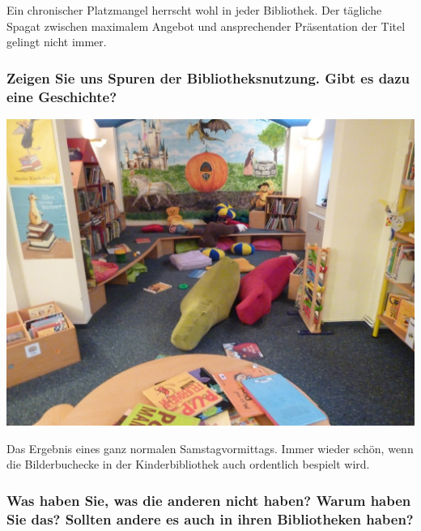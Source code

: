 Ein chronischer Platzmangel herrscht wohl in jeder Bibliothek. Der
tägliche Spagat zwischen maximalem Angebot und ansprechender
Präsentation der Titel gelingt nicht immer.

\hypertarget{zeigen-sie-uns-spuren-der-bibliotheksnutzung.-gibt-es-dazu-eine-geschichte}{%
\subsubsection*{Zeigen Sie uns Spuren der Bibliotheksnutzung. Gibt es dazu eine
Geschichte?}\label{zeigen-sie-uns-spuren-der-bibliotheksnutzung.-gibt-es-dazu-eine-geschichte}}

\begin{center}
\includegraphics{am-meer/img/bilderbuchecke.jpg}
\end{center}

Das Ergebnis eines ganz normalen Samstagvormittags. Immer wieder schön,
wenn die Bilderbuchecke in der Kinderbibliothek auch ordentlich bespielt
wird.

\hypertarget{was-haben-sie-was-die-anderen-nicht-haben-warum-haben-sie-das-sollten-andere-es-auch-in-ihren-bibliotheken-haben}{%
\subsubsection*{Was haben Sie, was die anderen nicht haben? Warum haben Sie
das? Sollten andere es auch in ihren Bibliotheken
haben?}\label{was-haben-sie-was-die-anderen-nicht-haben-warum-haben-sie-das-sollten-andere-es-auch-in-ihren-bibliotheken-haben}}

